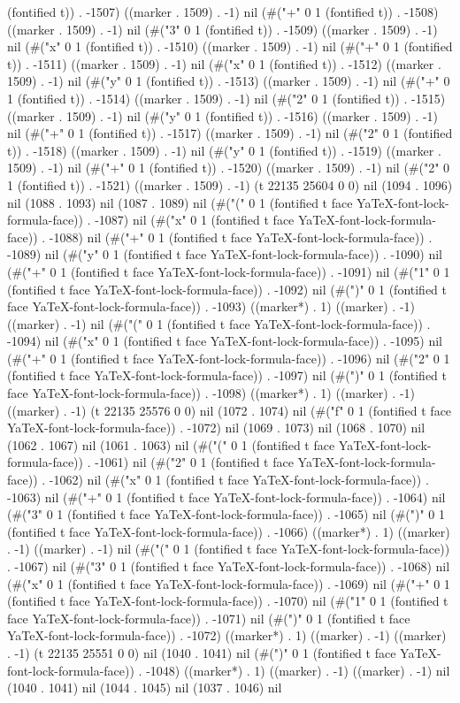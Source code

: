 (fontified t)) . -1507) ((marker . 1509) . -1) nil (#("+" 0 1 (fontified t)) . -1508) ((marker . 1509) . -1) nil (#("3" 0 1 (fontified t)) . -1509) ((marker . 1509) . -1) nil (#("x" 0 1 (fontified t)) . -1510) ((marker . 1509) . -1) nil (#("+" 0 1 (fontified t)) . -1511) ((marker . 1509) . -1) nil (#("x" 0 1 (fontified t)) . -1512) ((marker . 1509) . -1) nil (#("y" 0 1 (fontified t)) . -1513) ((marker . 1509) . -1) nil (#("+" 0 1 (fontified t)) . -1514) ((marker . 1509) . -1) nil (#("2" 0 1 (fontified t)) . -1515) ((marker . 1509) . -1) nil (#("y" 0 1 (fontified t)) . -1516) ((marker . 1509) . -1) nil (#("+" 0 1 (fontified t)) . -1517) ((marker . 1509) . -1) nil (#("2" 0 1 (fontified t)) . -1518) ((marker . 1509) . -1) nil (#("y" 0 1 (fontified t)) . -1519) ((marker . 1509) . -1) nil (#("+" 0 1 (fontified t)) . -1520) ((marker . 1509) . -1) nil (#("2" 0 1 (fontified t)) . -1521) ((marker . 1509) . -1) (t 22135 25604 0 0) nil (1094 . 1096) nil (1088 . 1093) nil (1087 . 1089) nil (#("(" 0 1 (fontified t face YaTeX-font-lock-formula-face)) . -1087) nil (#("x" 0 1 (fontified t face YaTeX-font-lock-formula-face)) . -1088) nil (#("+" 0 1 (fontified t face YaTeX-font-lock-formula-face)) . -1089) nil (#("y" 0 1 (fontified t face YaTeX-font-lock-formula-face)) . -1090) nil (#("+" 0 1 (fontified t face YaTeX-font-lock-formula-face)) . -1091) nil (#("1" 0 1 (fontified t face YaTeX-font-lock-formula-face)) . -1092) nil (#(")" 0 1 (fontified t face YaTeX-font-lock-formula-face)) . -1093) ((marker*) . 1) ((marker) . -1) ((marker) . -1) nil (#("(" 0 1 (fontified t face YaTeX-font-lock-formula-face)) . -1094) nil (#("x" 0 1 (fontified t face YaTeX-font-lock-formula-face)) . -1095) nil (#("+" 0 1 (fontified t face YaTeX-font-lock-formula-face)) . -1096) nil (#("2" 0 1 (fontified t face YaTeX-font-lock-formula-face)) . -1097) nil (#(")" 0 1 (fontified t face YaTeX-font-lock-formula-face)) . -1098) ((marker*) . 1) ((marker) . -1) ((marker) . -1) (t 22135 25576 0 0) nil (1072 . 1074) nil (#("f" 0 1 (fontified t face YaTeX-font-lock-formula-face)) . -1072) nil (1069 . 1073) nil (1068 . 1070) nil (1062 . 1067) nil (1061 . 1063) nil (#("(" 0 1 (fontified t face YaTeX-font-lock-formula-face)) . -1061) nil (#("2" 0 1 (fontified t face YaTeX-font-lock-formula-face)) . -1062) nil (#("x" 0 1 (fontified t face YaTeX-font-lock-formula-face)) . -1063) nil (#("+" 0 1 (fontified t face YaTeX-font-lock-formula-face)) . -1064) nil (#("3" 0 1 (fontified t face YaTeX-font-lock-formula-face)) . -1065) nil (#(")" 0 1 (fontified t face YaTeX-font-lock-formula-face)) . -1066) ((marker*) . 1) ((marker) . -1) ((marker) . -1) nil (#("(" 0 1 (fontified t face YaTeX-font-lock-formula-face)) . -1067) nil (#("3" 0 1 (fontified t face YaTeX-font-lock-formula-face)) . -1068) nil (#("x" 0 1 (fontified t face YaTeX-font-lock-formula-face)) . -1069) nil (#("+" 0 1 (fontified t face YaTeX-font-lock-formula-face)) . -1070) nil (#("1" 0 1 (fontified t face YaTeX-font-lock-formula-face)) . -1071) nil (#(")" 0 1 (fontified t face YaTeX-font-lock-formula-face)) . -1072) ((marker*) . 1) ((marker) . -1) ((marker) . -1) (t 22135 25551 0 0) nil (1040 . 1041) nil (#(")" 0 1 (fontified t face YaTeX-font-lock-formula-face)) . -1048) ((marker*) . 1) ((marker) . -1) ((marker) . -1) nil (1040 . 1041) nil (1044 . 1045) nil (1037 . 1046) nil 